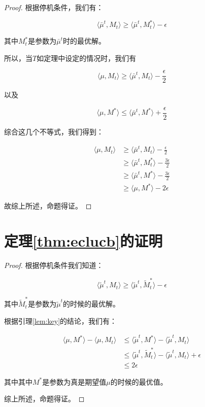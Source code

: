 \documentclass[bachelor]{thuthesis}
\begin{document}
\begin{proof}

根据停机条件，我们有：

\[\langle \bar{\mu}^t, M_t\rangle\ge \langle \bar{\mu}^t, M^*_t\rangle-\epsilon\]

其中$M^*_t$是参数为$\bar{\mu}^t$时的最优解。

所以，当$T$如定理中设定的情况时，我们有

\[\langle \mu, M_t\rangle\ge \langle \bar{\mu}^t, M_t\rangle-\frac{\epsilon}{2}\]

以及

\[\langle \mu, M^*\rangle\le \langle \bar{\mu}^t, M^*\rangle+\frac{\epsilon}{2}\]

综合这几个不等式，我们得到：

\begin{equation}
\begin{split}
\langle \mu, M_t\rangle  & \ge \langle \bar{\mu}^t, M_t\rangle-\frac{\epsilon}{2}\\
                         & \ge \langle \bar{\mu}^t, M^*_t\rangle-\frac{3\epsilon}{2}\\
                         & \ge \langle \bar{\mu}^t, M^*\rangle-\frac{3\epsilon}{2}\\
                         & \ge \langle \mu, M^*\rangle-2\epsilon
\end{split}
\end{equation}

故综上所述，命题得证。

\end{proof}

\section{定理\ref{thm:eclucb}的证明}

\begin{proof}

根据停机条件我们知道：

\[\langle \tilde{\mu}^t,M_t\rangle \ge \langle \tilde{\mu}^t,\tilde{M}^*_t\rangle-\epsilon\]

其中$\tilde{M}^*_t$是参数为$\tilde{\mu}^t$的时候的最优解。

根据引理\ref{lem:key}的结论，我们有：

\begin{equation}
\begin{split}
\langle \mu,M^*\rangle-\langle \mu,M_t\rangle & \le  \langle \tilde{\mu}^t,M^*\rangle-\langle \tilde{\mu}^t,M_t\rangle\\
                                              & \le  \langle \tilde{\mu}^t,\tilde{M}^*_t\rangle-\langle \tilde{\mu}^t,M_t\rangle +\epsilon\\
                                              & \le  2\epsilon
\end{split}
\end{equation}

其中其中$M^*$是参数为真是期望值$\mu$的时候的最优值。

综上所述，命题得证。

\end{proof}
\end{document}

